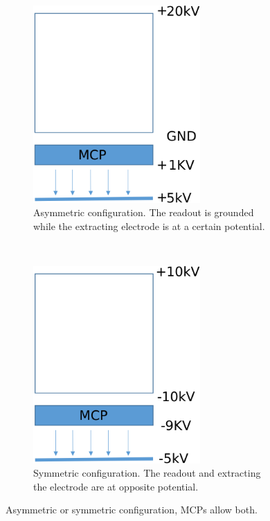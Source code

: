 \begin{figure}[!ht]
  \begin{subfigure}[t]{0.5\textwidth}
    \centering
    \captionsetup{width=.8\linewidth}
    \includegraphics[width=0.7\textwidth]{04_IPHI_Test/figures/fig000_setup_hv_asym2}
    \caption{Asymmetric configuration.
      The readout is grounded while the extracting electrode is at a certain potential.}
    \label{chap4:setup_hv_asym}
  \end{subfigure}
  ~
  \begin{subfigure}[t]{0.5\textwidth}
    \centering
    \captionsetup{width=.8\linewidth}
    \includegraphics[width=0.7\textwidth]{04_IPHI_Test/figures/fig000_setup_hv_sym}
    \caption{Symmetric configuration. The readout and extracting the electrode are at opposite potential.}
    \label{chap4:setup_hv_sym}
  \end{subfigure}
  \caption[Asymmetric or symmetric configuration]{Asymmetric or symmetric configuration, MCPs allow both.}
  \label{chap4:setup_hv}
\end{figure}
